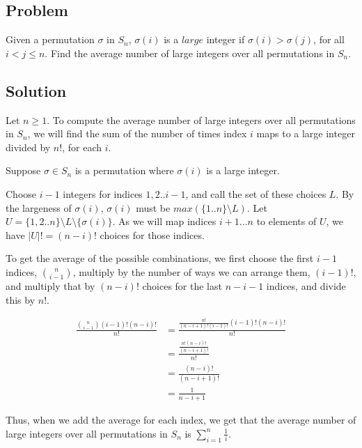 \documentclass{article}
\begin{document}
\begin{center}\item \section*{Problem}\end{center}

Given a permutation $\sigma$ in $S_n$, $\sigma(i)$ is a $large$ integer if $\sigma(i) > \sigma(j)$, for all $i < j \leq n$. Find the average number of large integers over all permutations in $S_n$.

\begin{center}\item \section*{Solution}\end{center}

Let $n \geq 1$. To compute the average number of large integers over all permutations in $S_n$, we will find the sum of the number of times index $i$ maps to a large integer divided by $n!$, for each $i$.

Suppose $\sigma \in S_n$ is a permutation where $\sigma(i)$ is a large integer.

Choose $i-1$ integers for indices $1,2..i-1$, and call the set of these choices $L$. By the largeness of $\sigma(i)$, $\sigma(i)$ must be 
$max(\{1..n\}\setminus L)$.
Let $U = \{1,2..n\}\setminus L \setminus \{\sigma(i)\}$.
As we will map indices $i+1...n$ to elements of $U$, we have $|U|!=(n-i)!$
choices for those indices.

To get the average of the possible combinations, we first choose the first $i-1$ indices, ${n\choose {i-1}}$, multiply by the number of ways we can arrange them, $(i-1)!$, and multiply that by $(n-i)!$ choices for the last $n-i-1$ indices, and divide this by $n!$.

\begin{align*}
    \frac{{n\choose {i-1}}(i-1)!(n-i)!}
         {n!}
  &=\frac{\frac{n!}
               {(n-i+1)!(i-1)!}(i-1)!(n-i)!}
         {n!}
\\&=\frac{\frac{n!(n-i)!}
               {(n-i+1)!}}
         {n!}
\\&=\frac{(n-i)!}
         {(n-i+1)!}
\\&=\frac{1}
         {n-i+1}
\end{align*}

Thus, when we add the average for each index, we get that the average number of large integers over all permutations in $S_n$ is 
$\displaystyle\sum\limits_{i=1}^n \frac{1}{i}$. 
\end{document}
